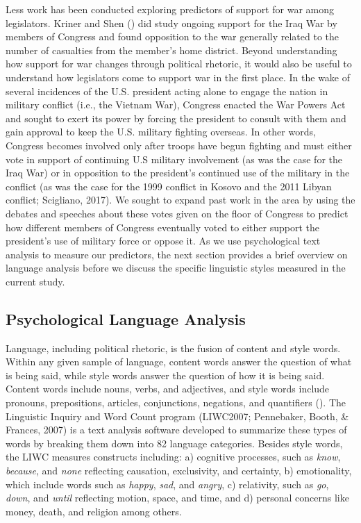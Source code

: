 \documentclass[jou,a4paper]{apa6}
\begin{document}
Less work has been conducted exploring predictors of support for war among legislators. Kriner and Shen (\citeyear{Kriner2014}) did study ongoing support for the Iraq War by members of Congress and found opposition to the war generally related to the number of casualties from the member's home district. Beyond understanding how support for war changes through political rhetoric, it would also be useful to understand how legislators come to support war in the first place. In the wake of several incidences of the U.S. president acting alone to engage the nation in military conflict (i.e., the Vietnam War), Congress enacted the War Powers Act and sought to exert its power by forcing the president to consult with them and gain approval to keep the U.S. military fighting overseas. In other words, Congress becomes involved only after troops have begun fighting and must either vote in support of continuing U.S military involvement (as was the case for the Iraq War) or in opposition to the president's continued use of the military in the conflict (as was the case for the 1999 conflict in Kosovo and the 2011 Libyan conflict; Scigliano, 2017). We sought to expand past work in the area by using the debates and speeches about these votes given on the floor of Congress to predict how different members of Congress eventually voted to either support the president's use of military force or oppose it. As we use psychological text analysis to measure our predictors, the next section provides a brief overview on language analysis before we discuss the specific linguistic styles measured in the current study.

\subsection{Psychological Language Analysis}

Language, including political rhetoric, is the fusion of content and style words. Within any given sample of language, content words answer the question of what is being said, while style words answer the question of how it is being said. Content words include nouns, verbs, and adjectives, and style words include pronouns, prepositions, articles, conjunctions, negations, and quantifiers (\cite{Pennebaker2011}). The Linguistic Inquiry and Word Count program (LIWC2007; Pennebaker, Booth, \& Frances, 2007) is a text analysis software developed to summarize these types of words by breaking them down into 82 language categories. Besides style words, the LIWC measures constructs including: a) cognitive processes, such as \emph{know}, \emph{because}, and \emph{none} reflecting causation, exclusivity, and certainty, b) emotionality, which include words such as \emph{happy}, \emph{sad}, and \emph{angry}, c) relativity, such as \emph{go}, \emph{down}, and \emph{until} reflecting motion, space, and time, and d) personal concerns like money, death, and religion among others.
\end{document}

